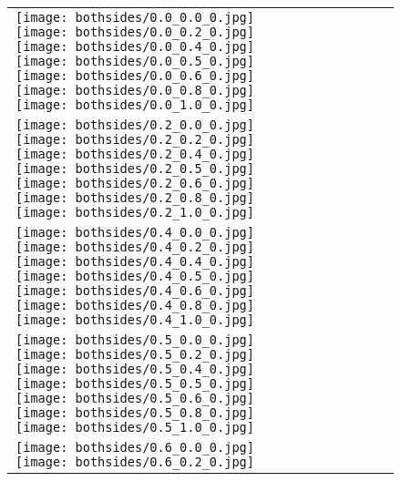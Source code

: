 \documentclass[10pt,twocolumn,letterpaper]{article}
\begin{document}
 \begin{figure}[tb!]
    \centering
    \setlength{\tabcolsep}{0.5pt}
    {\small
    \renewcommand{\arraystretch}{0.5} 
    \begin{tabular}{c c c c c c c c c c}
    \captionsetup{type=figure, font=scriptsize}
    \raisebox{0.1in}{\rotatebox{90}{\small \emph{$0.0$}
 }}
  \texttt{[image: bothsides/0.0\_0.0\_0.jpg]}
  \texttt{[image: bothsides/0.0\_0.2\_0.jpg]}
  \texttt{[image: bothsides/0.0\_0.4\_0.jpg]}
  \texttt{[image: bothsides/0.0\_0.5\_0.jpg]}
  \texttt{[image: bothsides/0.0\_0.6\_0.jpg]}
  \texttt{[image: bothsides/0.0\_0.8\_0.jpg]}
  \texttt{[image: bothsides/0.0\_1.0\_0.jpg]}
 \tabularnewline
     \raisebox{0.1in}{\rotatebox{90}{\small \emph{$0.2$}
 }}
  \texttt{[image: bothsides/0.2\_0.0\_0.jpg]}
  \texttt{[image: bothsides/0.2\_0.2\_0.jpg]}
  \texttt{[image: bothsides/0.2\_0.4\_0.jpg]}
  \texttt{[image: bothsides/0.2\_0.5\_0.jpg]}
  \texttt{[image: bothsides/0.2\_0.6\_0.jpg]}
  \texttt{[image: bothsides/0.2\_0.8\_0.jpg]}
  \texttt{[image: bothsides/0.2\_1.0\_0.jpg]}
\tabularnewline
    \raisebox{0.1in}{\rotatebox{90}{\small \emph{$0.4$}
 }}
  \texttt{[image: bothsides/0.4\_0.0\_0.jpg]}
  \texttt{[image: bothsides/0.4\_0.2\_0.jpg]}
  \texttt{[image: bothsides/0.4\_0.4\_0.jpg]}
  \texttt{[image: bothsides/0.4\_0.5\_0.jpg]}
  \texttt{[image: bothsides/0.4\_0.6\_0.jpg]}
  \texttt{[image: bothsides/0.4\_0.8\_0.jpg]}
  \texttt{[image: bothsides/0.4\_1.0\_0.jpg]}
\tabularnewline
    \raisebox{0.1in}{\rotatebox{90}{\small \emph{$0.5$}
 }}
  \texttt{[image: bothsides/0.5\_0.0\_0.jpg]}
  \texttt{[image: bothsides/0.5\_0.2\_0.jpg]}
  \texttt{[image: bothsides/0.5\_0.4\_0.jpg]}
  \texttt{[image: bothsides/0.5\_0.5\_0.jpg]}
  \texttt{[image: bothsides/0.5\_0.6\_0.jpg]}
  \texttt{[image: bothsides/0.5\_0.8\_0.jpg]}
  \texttt{[image: bothsides/0.5\_1.0\_0.jpg]}
\tabularnewline
    \raisebox{0.1in}{\rotatebox{90}{\small \emph{$0.6$}
 }}
  \texttt{[image: bothsides/0.6\_0.0\_0.jpg]}
  \texttt{[image: bothsides/0.6\_0.2\_0.jpg]}

\end{tabular}}
\end{figure}
\end{document}
